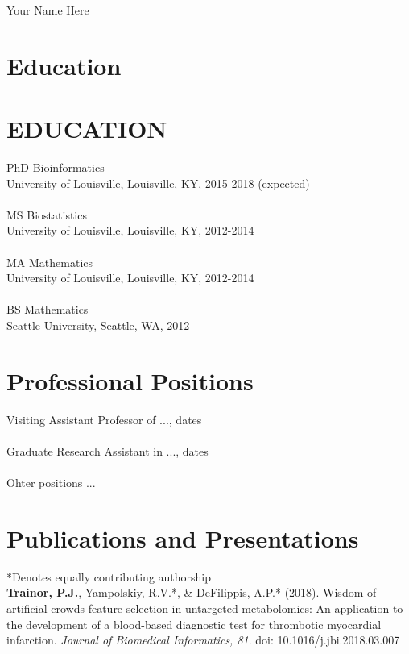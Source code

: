 \begin{center}
\large
Your Name Here
\end{center}

\bigskip


\section*{Education} 

\section{EDUCATION}
 PhD Bioinformatics  \\
University of Louisville, Louisville, KY, 2015-2018 (expected)  \\ \\
 MS Biostatistics  \\
University of Louisville, Louisville, KY, 2012-2014  \\ \\
MA Mathematics  \\
University of Louisville, Louisville, KY, 2012-2014 \\ \\
BS Mathematics  \\
Seattle University, Seattle, WA, 2012


\section*{Professional Positions}

Visiting Assistant Professor of ..., dates \\ \\
Graduate Research Assistant in  ..., dates \\ \\
Ohter positions ...

\section*{Publications and Presentations}
*Denotes equally contributing authorship \\

\textbf{Trainor, P.J.}, Yampolskiy, R.V.*, \& DeFilippis, A.P.* (2018). Wisdom of artificial crowds feature selection in untargeted metabolomics: An application to the development of a blood-based diagnostic test for thrombotic myocardial infarction. \emph{Journal of Biomedical Informatics, 81}.  doi: 10.1016/j.jbi.2018.03.007 \\

